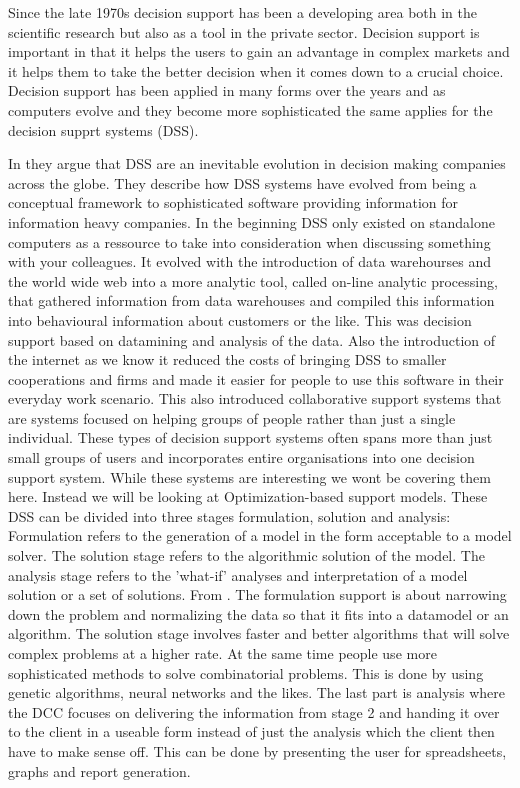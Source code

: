 Since the late 1970s decision support has been a developing area both in the scientific research but also as a tool in the private sector. Decision support is important in that it helps the users to gain an advantage in complex markets and it helps them to take the better decision when it comes down to a crucial choice. Decision support has been applied in many forms over the years and as computers evolve and they become more sophisticated the same applies for the decision supprt systems (DSS).

In \cite{shim2002past} they argue that DSS are an inevitable evolution in decision making companies across the globe. They describe how DSS systems have evolved from being a conceptual framework to sophisticated software providing information for information heavy companies. In the beginning DSS only existed on standalone computers as a ressource to take into consideration when discussing something with your colleagues. It evolved with the introduction of data warehourses and the world wide web into a more analytic tool, called on-line analytic processing, that gathered information from data warehouses and compiled this information into behavioural information about customers or the like. This was decision support based on datamining and analysis of the data. Also the introduction of the internet as we know it reduced the costs of bringing DSS to smaller cooperations and firms and made it easier for people to use this software in their everyday work scenario. This also introduced collaborative support systems that are systems focused on helping groups of people rather than just a single individual. These types of decision support systems often spans more than just small groups of users and incorporates entire organisations into one decision support system. While these systems are interesting we wont be covering them here. Instead we will be looking at Optimization-based support models. These DSS can be divided into three stages formulation, solution and analysis:
Formulation refers to the generation of a model in the form acceptable to a model solver. The solution stage refers to the algorithmic solution of the model. The analysis stage refers to the 'what-if' analyses and interpretation of a model solution or a set of solutions. From \cite{shim2002past}.
The formulation support is about narrowing down the problem and normalizing the data so that it fits into a datamodel or an algorithm. The solution stage involves faster and better algorithms that will solve complex problems at a higher rate. At the same time people use more sophisticated methods to solve combinatorial problems. This is done by using genetic algorithms, neural networks and the likes\cite{shim2002past}. The last part is analysis where the DCC focuses on delivering the information from stage 2 and handing it over to the client in a useable form instead of just the analysis which the client then have to make sense off. This can be done by presenting the user for spreadsheets, graphs and report generation.

